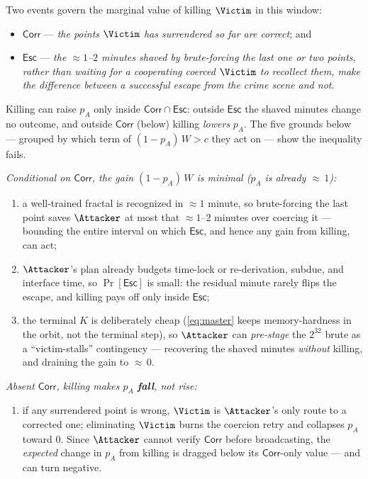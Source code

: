 Two events govern the marginal value of killing $\Victim$ in this window:
\begin{itemize}[nosep,leftmargin=1.4em]
  \item $\mathsf{Corr}$ --- \emph{the points $\Victim$ has surrendered so far are
        correct}; and
  \item $\mathsf{Esc}$ --- \emph{the ${\approx}1$--$2$ minutes shaved by
        brute-forcing the last one or two points, rather than waiting for a
        cooperating coerced $\Victim$ to recollect them, make the difference
        between a successful escape from the crime scene and not}.
\end{itemize}
Killing can raise $p_A$ only inside $\mathsf{Corr}\cap\mathsf{Esc}$: outside
$\mathsf{Esc}$ the shaved minutes change no outcome, and outside $\mathsf{Corr}$
(below) killing \emph{lowers} $p_A$. The five grounds below --- grouped by which
term of $(1 - p_A)\,W > c$ they act on --- show the inequality fails.

\smallskip
\noindent\emph{Conditional on $\mathsf{Corr}$, the gain $(1 - p_A)\,W$ is minimal
($p_A$ is already ${\approx}\,1$):}
\begin{enumerate}[nosep,leftmargin=1.6em]
  \item a well-trained fractal is recognized in ${\approx}1$ minute, so
        brute-forcing the last point saves $\Attacker$ at most that
        ${\approx}1$--$2$ minutes over coercing it --- bounding the entire
        interval on which $\mathsf{Esc}$, and hence any gain from killing, can
        act;
  \item $\Attacker$'s plan already budgets time-lock or re-derivation, subdue, and
        interface time, so $\Pr[\mathsf{Esc}]$ is small: the residual minute
        rarely flips the escape, and killing pays off only inside $\mathsf{Esc}$;
  \item the terminal $K$ is deliberately cheap (\eqref{eq:master} keeps
        memory-hardness in the orbit, not the terminal step), so $\Attacker$ can
        \emph{pre-stage} the $2^{32}$ brute as a ``victim-stalls'' contingency ---
        recovering the shaved minutes \emph{without} killing, and draining the
        gain to ${\approx}\,0$.
\end{enumerate}

\noindent\emph{Absent $\mathsf{Corr}$, killing makes $p_A$ \textbf{fall}, not
rise:}
\begin{enumerate}[nosep,leftmargin=1.6em,start=4]
  \item if any surrendered point is wrong, $\Victim$ is $\Attacker$'s only route
        to a corrected one; eliminating $\Victim$ burns the coercion retry and
        collapses $p_A$ toward $0$. Since $\Attacker$ cannot verify
        $\mathsf{Corr}$ before broadcasting, the \emph{expected} change in $p_A$
        from killing is dragged below its $\mathsf{Corr}$-only value --- and can
        turn negative.
\end{enumerate}

